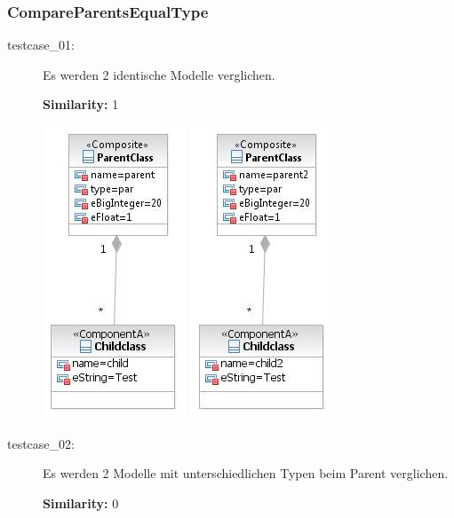 \documentclass[a4paper]{article}
\begin{document}
\subsubsection{CompareParentsEqualType}

  \begin{description}
  \item[testcase\_01:] Es werden 2 identische Modelle verglichen.    
  
  \textbf{Similarity:} 1
  
	\includegraphics[scale=0.9]{CompareParentsEqualTypeTestScreens/Testcase01model1.jpeg}
	\includegraphics[scale=0.9]{CompareParentsEqualTypeTestScreens/Testcase01model2.jpeg}
	
  \item[testcase\_02:] Es werden 2 Modelle mit unterschiedlichen Typen beim Parent verglichen.
    
  \textbf{Similarity:} 0
  

\end{description}
\end{document}
